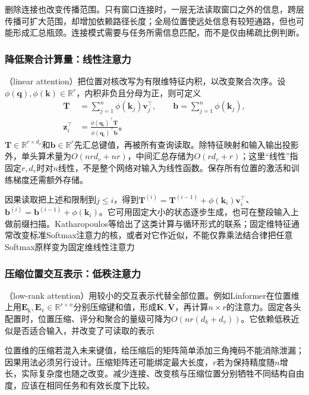 删除连接也改变传播范围。只有窗口连接时，一层无法读取窗口之外的信息，跨层传播可扩大范围，却增加依赖路径长度；全局位置使远处信息有较短通路，但也可能形成汇总瓶颈。连接模式需要与任务所需信息匹配，而不是仅由稀疏比例判断。

\subsubsection{降低聚合计算量：线性注意力}

（linear attention）把位置对核改写为有限维特征内积，以改变聚合次序。设$\phi(\bm q),\phi(\bm k)\in\mathbb R^r$，内积非负且分母为正，则可定义
\begin{equation}
  \begin{aligned}
    \bm T&=\sum_{j=1}^n\phi(\bm k_j)\bm v_j^{\top},\qquad
    \bm b=\sum_{j=1}^n\phi(\bm k_j),\\
    \bm z_i^{\top}&=\frac{\phi(\bm q_i)^{\top}\bm T}
                           {\phi(\bm q_i)^{\top}\bm b}\text{。}
  \end{aligned}
  \label{eq:transformer-linear-attention}
\end{equation}
$\bm T\in\mathbb R^{r\times d_v}$和$\bm b\in\mathbb R^r$先汇总键值，再被所有查询读取。除特征映射和输入输出投影外，单头算术量为$O(nrd_v+nr)$，中间汇总存储为$O(rd_v+r)$；这里“线性”指固定$r,d_v$时对$n$线性，不是整个网络对输入为线性函数。保存所有位置的激活和训练梯度还需额外存储。

因果读取把上述和限制到$j\leq i$，得到$\bm T^{(i)}=\bm T^{(i-1)}+\phi(\bm k_i)\bm v_i^{\top}$、$\bm b^{(i)}=\bm b^{(i-1)}+\phi(\bm k_i)$。它可用固定大小的状态逐步生成，也可在整段输入上做前缀扫描。Katharopoulos等给出了这类计算与循环形式的联系；固定维特征通常改变标准Softmax注意力的核，或者对它作近似，不能仅靠乘法结合律把任意Softmax原样变为固定维线性注意力

\subsubsection{压缩位置交互表示：低秩注意力}

（low-rank attention）用较小的交互表示代替全部位置。例如Linformer在位置维上用$\bm E_{\mathrm k},\bm E_{\mathrm v}\in\mathbb R^{r\times n}$分别压缩键和值，形成$\overline{\bm K},\overline{\bm V}$，再计算$n\times r$的注意力。固定各头配置时，位置压缩、评分和聚合的量级可降为$O(nr(d_k+d_v))$。它依赖低秩近似是否适合输入，并改变了可读取的表示

位置维的压缩若混入未来键值，给压缩后的矩阵简单添加三角掩码不能消除泄漏；因果用法必须另行设计。压缩矩阵还可能绑定最大长度，$r$若为保持精度随$n$增长，实际复杂度也随之改变。减少连接、改变核与压缩位置分别牺牲不同结构自由度，应该在相同任务和有效长度下比较。


